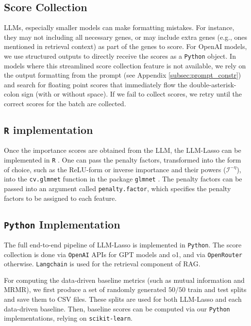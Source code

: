 
\subsection{Score Collection}\label{subsec:score_collection}
LLMs, especially smaller models can make formatting mistakes. For instance, they may not including all necessary genes, or may include extra genes (e.g., ones mentioned in retrieval context) as part of the genes to score.
For OpenAI models, we use structured outputs to directly receive the scores as a \texttt{Python} object.
In models where this streamlined score collection feature is not available, we rely on the output formatting from the prompt (see Appendix \ref{subsec:prompt_constr}) and search for floating point scores that immediately flow the double-asterisk-colon sign (with or without space).
If we fail to collect scores, we retry until the correct scores for the batch are collected.

\subsection{\texttt{R} implementation}\label{appdx:r-impl}
Once the importance scores are obtained from the LLM, the LLM-Lasso can be implemented in \texttt{R} \cite{Rpackage}. One can pass the penalty factors, transformed into the form of choice, such as the ReLU-form or inverse importance and their powers ($\mathcal{I}^{-\eta}$), into the \texttt{cv.glmnet} function in the package \texttt{glmnet} \cite{glmnet}. The penalty factors can be passed into an argument called \texttt{penalty.factor}, which specifies the penalty factors to be assigned to each feature. 

\subsection{\texttt{Python} Implementation}\label{app:python-implementation}
The full end-to-end pipeline of LLM-Lasso is implemented in \texttt{Python}.
The score collection is done via \texttt{OpenAI} APIs for GPT models and o1, and via \texttt{OpenRouter} otherwise.
\texttt{Langchain} is used for the retrieval component of RAG.

For computing the data-driven baseline metrics (such as mutual information and MRMR), we first produce a set of randomly generated $50/50$ train and test splits and save them to CSV files.
These splits are used for both LLM-Lasso and each data-driven baseline.
Then, baseline scores can be computed via our \texttt{Python} implementations, relying on \texttt{scikit-learn}.

